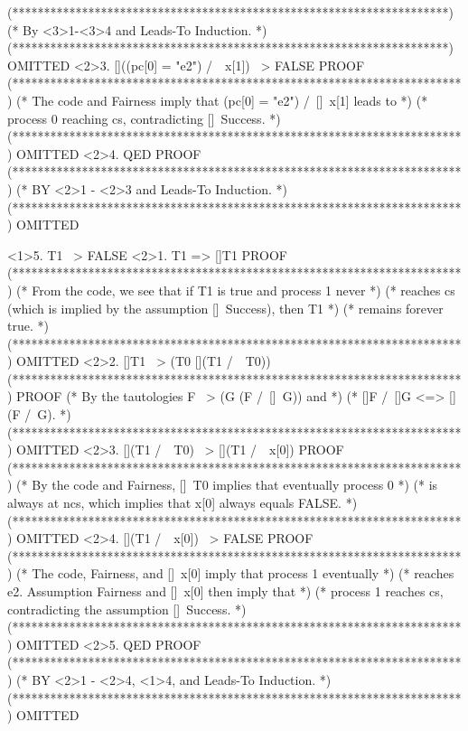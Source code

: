 \documentclass[fleqn,leqno]{article}
\begin{document}
\begin{verbatim*}
      (*********************************************************************)
      (* By <3>1-<3>4 and Leads-To Induction.                              *)
      (*********************************************************************) OMITTED
  <2>3. []((pc[0] = "e2") /\ ~x[1]) ~> FALSE                                  PROOF 
    (***********************************************************************)
    (* The code and Fairness imply that (pc[0] = "e2") /\ []~x[1] leads to *)
    (* process 0 reaching cs, contradicting []~Success.                    *)
    (***********************************************************************) OMITTED
  <2>4. QED                                                                   PROOF
    (***********************************************************************)
    (* BY <2>1 - <2>3 and Leads-To Induction.                              *)
    (***********************************************************************) OMITTED
  
<1>5. T1 ~> FALSE
  <2>1. T1 => []T1                                                            PROOF
    (***********************************************************************)
    (* From the code, we see that if T1 is true and process 1 never        *)
    (* reaches cs (which is implied by the assumption []~Success), then T1 *)
    (* remains forever true.                                               *)
    (***********************************************************************) OMITTED
  <2>2. []T1  ~>  (T0 \/ [](T1 /\ ~T0))
    (***********************************************************************) PROOF
    (* By the tautologies F ~> (G \/ (F /\ []~G)) and                      *)
    (* []F /\ []G <=> [](F /\ G).                                          *)
    (***********************************************************************) OMITTED
  <2>3. [](T1 /\ ~T0)  ~>  [](T1 /\ ~x[0])                                    PROOF
    (***********************************************************************)
    (* By the code and Fairness, []~T0 implies that eventually process 0   *)
    (* is always at ncs, which implies that x[0] always equals FALSE.      *)
    (***********************************************************************) OMITTED
  <2>4. [](T1 /\ ~x[0]) ~> FALSE                                              PROOF
    (***********************************************************************)
    (* The code, Fairness, and []~x[0] imply that process 1 eventually     *)
    (* reaches e2.  Assumption Fairness and []~x[0] then imply that        *)
    (* process 1 reaches cs, contradicting the assumption []~Success.      *)
    (***********************************************************************) OMITTED
  <2>5. QED                                                                   PROOF
    (***********************************************************************)
    (* BY <2>1 - <2>4, <1>4, and Leads-To Induction.                       *)
    (***********************************************************************) OMITTED


\end{verbatim*}
\end{document}
